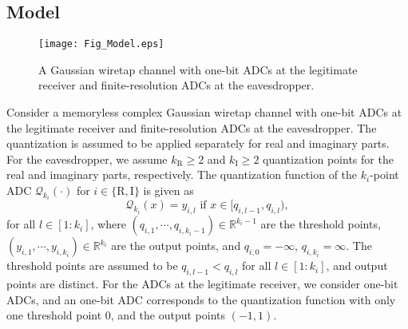 \documentclass[journal]{IEEEtran}
\begin{document}
\subsection{Model}

\begin{figure}[t]
    \centering
    \texttt{[image: Fig\_Model.eps]}
    \caption{A Gaussian wiretap channel with one-bit ADCs at the legitimate receiver and finite-resolution ADCs at the eavesdropper.}
    \label{fig:Model}
\end{figure}


Consider a memoryless complex Gaussian wiretap channel with one-bit ADCs at the legitimate receiver and finite-resolution ADCs at the eavesdropper. The quantization is assumed to be applied separately for real and imaginary parts. 
For the eavesdropper, we assume $k_{\mathrm{R}}\geq 2$ and $k_{\mathrm{I}}\geq 2$ quantization points for the real and imaginary parts, respectively. The quantization function of the $k_i$-point ADC $\mathcal{Q}_{k_i}(\cdot)$ for $i \in \{\mathrm{R},\mathrm{I}\}$ is given as
\begin{equation}
    \mathcal{Q}_{k_i}(x) = y_{i,l} \text{ if }x \in [q_{i,l-1},q_{i,l}), 
\end{equation}
for all $l \in [1:k_i]$, where  ${(q_{i,1},\cdots,q_{i,k_i -1}) \in \mathbb{R}^{k_i-1}}$ are the threshold points, ${(y_{i,1},\cdots,y_{i,k_i}) \in \mathbb{R}^{k_i}}$ are the output points, and ${q_{i,0}=-\infty}$, ${q_{i,{k_i}}=\infty}$. The threshold points are assumed to be ${q_{i,l-1}<q_{i,l}}$ for all $l \in [1:k_i]$, and output points are distinct. For the ADCs at the legitimate receiver, we consider one-bit ADCs, and an one-bit ADC  corresponds to the quantization function with only one threshold point $0$, and the output points $(-1,1)$. 
\end{document}
